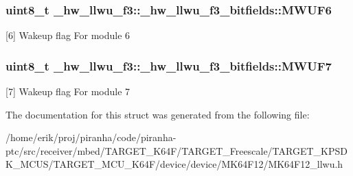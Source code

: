 \subsubsection[{\texorpdfstring{M\+W\+U\+F6}{MWUF6}}]{\setlength{\rightskip}{0pt plus 5cm}uint8\+\_\+t \+\_\+hw\+\_\+llwu\+\_\+f3\+::\+\_\+hw\+\_\+llwu\+\_\+f3\+\_\+bitfields\+::\+M\+W\+U\+F6}\hypertarget{struct__hw__llwu__f3_1_1__hw__llwu__f3__bitfields_a1abbbb977b3512a66be8b32b509c3527}{}\label{struct__hw__llwu__f3_1_1__hw__llwu__f3__bitfields_a1abbbb977b3512a66be8b32b509c3527}
\mbox{[}6\mbox{]} Wakeup flag For module 6 
\subsubsection[{\texorpdfstring{M\+W\+U\+F7}{MWUF7}}]{\setlength{\rightskip}{0pt plus 5cm}uint8\+\_\+t \+\_\+hw\+\_\+llwu\+\_\+f3\+::\+\_\+hw\+\_\+llwu\+\_\+f3\+\_\+bitfields\+::\+M\+W\+U\+F7}\hypertarget{struct__hw__llwu__f3_1_1__hw__llwu__f3__bitfields_a989738f1aa84a4eb097d728b89471f34}{}\label{struct__hw__llwu__f3_1_1__hw__llwu__f3__bitfields_a989738f1aa84a4eb097d728b89471f34}
\mbox{[}7\mbox{]} Wakeup flag For module 7 

The documentation for this struct was generated from the following file\+:\begin{DoxyCompactItemize}
\item 
/home/erik/proj/piranha/code/piranha-\/ptc/src/receiver/mbed/\+T\+A\+R\+G\+E\+T\+\_\+\+K64\+F/\+T\+A\+R\+G\+E\+T\+\_\+\+Freescale/\+T\+A\+R\+G\+E\+T\+\_\+\+K\+P\+S\+D\+K\+\_\+\+M\+C\+U\+S/\+T\+A\+R\+G\+E\+T\+\_\+\+M\+C\+U\+\_\+\+K64\+F/device/device/\+M\+K64\+F12/M\+K64\+F12\+\_\+llwu.\+h\end{DoxyCompactItemize}
